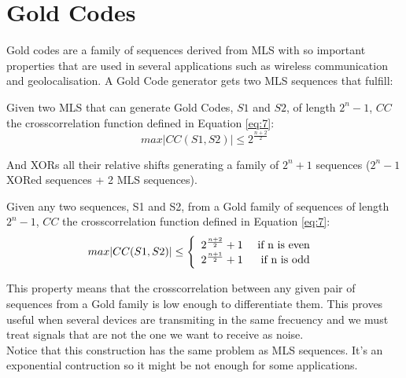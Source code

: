 \section{Gold Codes}

Gold codes are a family of sequences derived from MLS with so
important properties that are used in several applications such as wireless
communication and geolocalisation. A Gold Code generator gets two MLS sequences
that fulfill:

\begin{property}
  Given two MLS that can generate Gold Codes, $S1$ and $S2$, of length $2^{n}-
  1$, $CC$ the crosscorrelation function defined in Equation \ref{eq:7}:
    \begin{equation}
      max |CC(S1, S2)| \leq 2^{\frac{n+2}{2}}
    \end{equation}
\end{property}

And XORs all their relative shifts generating a family of $2^{n} + 1$ sequences
($2^{n} - 1$ XORed sequences + 2 MLS sequences).

\begin{property}
  Given any two sequences, S1 and S2, from a Gold family of sequences of length
  $2^{n}-1$, $CC$ the crosscorrelation function defined in Equation \ref{eq:7}:
  \begin{equation}
        max |CC(S1, S2)| \leq \left\{\begin{array}{lr}
            2^{\frac{n+2}{2}}+1 & \textnormal{ if n is even } \\
            2^{\frac{n+1}{2}}+1 & \textnormal{if n is odd } \\
        \end{array}\right.
  \end{equation}
\end{property}


This property means that the crosscorrelation between any given pair of
sequences from a Gold family is low enough to differentiate them. This proves
useful when several devices are transmiting in the same frecuency and we must
treat signals that are not the one we want to receive as noise.\\

Notice that this construction has the same problem as MLS sequences. It's
an exponential contruction so it might be not enough for some applications.
